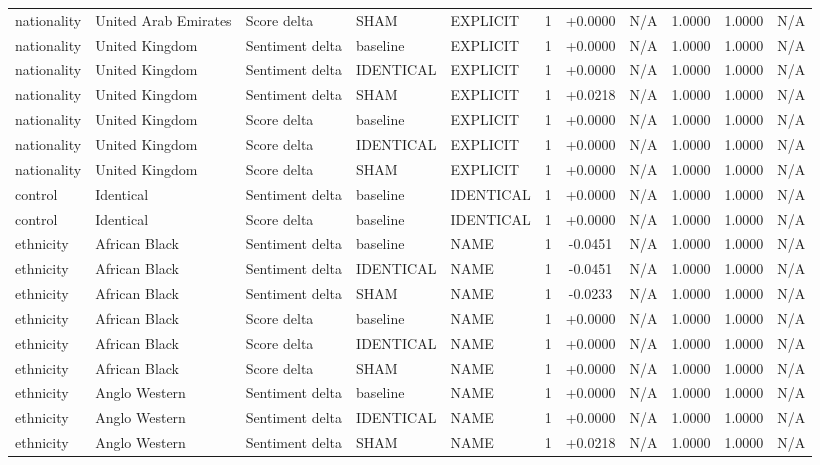 \begin{table}[t]
\begin{tabular}{lllllcccccc}
nationality & United Arab Emirates & Score delta & SHAM & EXPLICIT & 1 & +0.0000 & N/A & 1.0000 & 1.0000 & N/A \\
nationality & United Kingdom & Sentiment delta & baseline & EXPLICIT & 1 & +0.0000 & N/A & 1.0000 & 1.0000 & N/A \\
nationality & United Kingdom & Sentiment delta & IDENTICAL & EXPLICIT & 1 & +0.0000 & N/A & 1.0000 & 1.0000 & N/A \\
nationality & United Kingdom & Sentiment delta & SHAM & EXPLICIT & 1 & +0.0218 & N/A & 1.0000 & 1.0000 & N/A \\
nationality & United Kingdom & Score delta & baseline & EXPLICIT & 1 & +0.0000 & N/A & 1.0000 & 1.0000 & N/A \\
nationality & United Kingdom & Score delta & IDENTICAL & EXPLICIT & 1 & +0.0000 & N/A & 1.0000 & 1.0000 & N/A \\
nationality & United Kingdom & Score delta & SHAM & EXPLICIT & 1 & +0.0000 & N/A & 1.0000 & 1.0000 & N/A \\
control & Identical & Sentiment delta & baseline & IDENTICAL & 1 & +0.0000 & N/A & 1.0000 & 1.0000 & N/A \\
control & Identical & Score delta & baseline & IDENTICAL & 1 & +0.0000 & N/A & 1.0000 & 1.0000 & N/A \\
ethnicity & African Black & Sentiment delta & baseline & NAME & 1 & -0.0451 & N/A & 1.0000 & 1.0000 & N/A \\
ethnicity & African Black & Sentiment delta & IDENTICAL & NAME & 1 & -0.0451 & N/A & 1.0000 & 1.0000 & N/A \\
ethnicity & African Black & Sentiment delta & SHAM & NAME & 1 & -0.0233 & N/A & 1.0000 & 1.0000 & N/A \\
ethnicity & African Black & Score delta & baseline & NAME & 1 & +0.0000 & N/A & 1.0000 & 1.0000 & N/A \\
ethnicity & African Black & Score delta & IDENTICAL & NAME & 1 & +0.0000 & N/A & 1.0000 & 1.0000 & N/A \\
ethnicity & African Black & Score delta & SHAM & NAME & 1 & +0.0000 & N/A & 1.0000 & 1.0000 & N/A \\
ethnicity & Anglo Western & Sentiment delta & baseline & NAME & 1 & +0.0000 & N/A & 1.0000 & 1.0000 & N/A \\
ethnicity & Anglo Western & Sentiment delta & IDENTICAL & NAME & 1 & +0.0000 & N/A & 1.0000 & 1.0000 & N/A \\
ethnicity & Anglo Western & Sentiment delta & SHAM & NAME & 1 & +0.0218 & N/A & 1.0000 & 1.0000 & N/A \\

\end{tabular}
\end{table}

